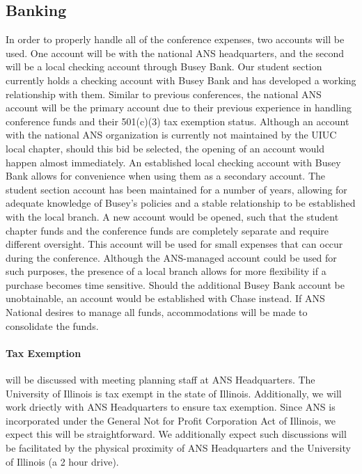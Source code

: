 \subsection{Banking}

In order to properly handle all of the conference expenses, two accounts will be used. One account will be with the national ANS headquarters, and the second will be a local checking account through Busey Bank. Our student section currently holds a checking account with Busey Bank and has developed a working relationship with them. Similar to previous conferences, the national ANS account will be the primary account due to their previous experience in handling conference funds and their 501(c)(3) tax exemption status. Although an account with the national ANS organization is currently not maintained by the UIUC local chapter, should this bid be selected, the opening of an account would happen almost immediately. An established local checking account with Busey Bank allows for convenience when using them as a secondary account. The student section account has been maintained for a number of years, allowing for adequate knowledge of Busey’s policies and a stable relationship to be established with the local branch. A new account would be opened, such that the student chapter funds and the conference funds are completely separate and require different oversight. This account will be used for small expenses that can occur during the conference. Although the ANS-managed account could be used for such purposes, the presence of a local branch allows for more flexibility if a purchase becomes time sensitive. Should the additional Busey Bank account be unobtainable, an account would be established with Chase instead. If ANS National desires to manage all funds, accommodations will be made to consolidate the funds.

\paragraph{Tax Exemption} will be discussed with meeting planning staff at
ANS Headquarters. The University of Illinois is tax exempt in the state of Illinois. 
Additionally, we will work driectly with ANS Headquarters to ensure tax 
exemption. Since ANS is incorporated under the General Not for Profit 
Corporation Act of Illinois, we expect this will be straightforward. We 
additionally expect such discussions will be facilitated by the physical 
proximity of ANS Headquarters and the University of Illinois (a 2 hour drive).

